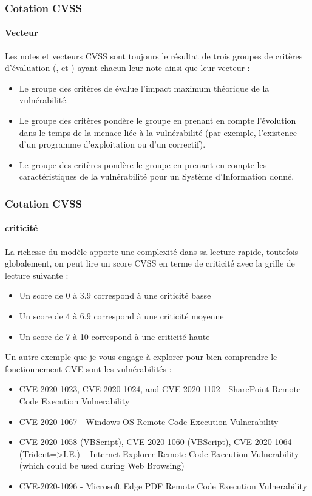 \begin{frame}
\frametitle<presentation>{Cotation CVSS}
\framesubtitle<presentation>{Vecteur}
Les notes et vecteurs CVSS sont toujours le résultat de trois groupes de critères d'évaluation (,  et ) ayant chacun leur note ainsi que leur vecteur :
\begin{itemize}
  \item Le groupe des critères de\textbf{ } évalue l'impact maximum théorique de la vulnérabilité.
  \item Le groupe des critères\textbf{   }pondère le groupe  en prenant en compte  l'évolution dans le temps de la menace liée à la vulnérabilité  (par exemple, l'existence d'un programme d’exploitation ou d'un correctif).
  \item Le groupe des critères\textbf{  }pondère le groupe  en prenant en compte les caractéristiques de la vulnérabilité pour un Système d'Information donné.
\end{itemize}
\end{frame}

\begin{frame}
\frametitle<presentation>{Cotation CVSS}
\framesubtitle<presentation>{criticité}
La richesse du modèle apporte une complexité dans sa lecture rapide, toutefois globalement, on peut lire un score CVSS en terme de criticité avec la grille de lecture suivante :

\begin{itemize}
  \item Un score de 0 à 3.9 correspond à une criticité basse
  \item Un score de 4 à 6.9 correspond à une criticité moyenne
  \item Un score de 7 à 10 correspond à une criticité haute
\end{itemize}
\end{frame}


Un autre exemple que je vous engage à explorer pour bien comprendre le fonctionnement CVE sont les vulnérabilités : 
\begin{itemize}
  \item CVE-2020-1023, CVE-2020-1024, and CVE-2020-1102 - SharePoint Remote Code Execution Vulnerability
  \item          CVE-2020-1067 - Windows OS Remote Code Execution Vulnerability
  \item        CVE-2020-1058 (VBScript), CVE-2020-1060 (VBScript), CVE-2020-1064 (Trident=>I.E.) – Internet Explorer Remote Code Execution Vulnerability (which could be used during Web Browsing)
  \item         CVE-2020-1096 - Microsoft Edge PDF Remote Code Execution Vulnerability
\end{itemize}



